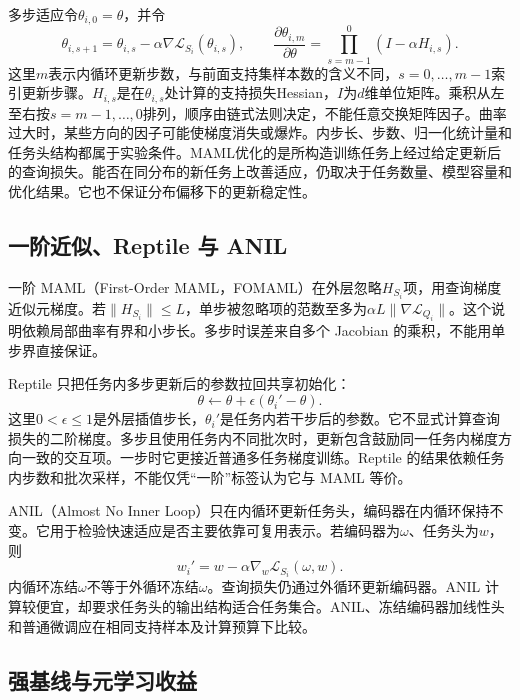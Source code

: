 多步适应令$\theta_{i,0}=\theta$，并令
\begin{equation}
\theta_{i,s+1}=\theta_{i,s}-\alpha\nabla\mathcal L_{S_i}(\theta_{i,s}),\qquad
\frac{\partial\theta_{i,m}}{\partial\theta}
=\prod_{s=m-1}^{0}(I-\alpha H_{i,s}).
\end{equation}
这里$m$表示内循环更新步数，与前面支持集样本数的含义不同，$s=0,\ldots,m-1$索引更新步骤。$H_{i,s}$是在$\theta_{i,s}$处计算的支持损失Hessian，$I$为$d$维单位矩阵。乘积从左至右按$s=m-1,\ldots,0$排列，顺序由链式法则决定，不能任意交换矩阵因子。曲率过大时，某些方向的因子可能使梯度消失或爆炸。内步长、步数、归一化统计量和任务头结构都属于实验条件。MAML优化的是所构造训练任务上经过给定更新后的查询损失。能否在同分布的新任务上改善适应，仍取决于任务数量、模型容量和优化结果。它也不保证分布偏移下的更新稳定性。

\subsection{一阶近似、Reptile 与 ANIL}

一阶 MAML（First-Order MAML，FOMAML）在外层忽略$H_{S_i}$项，用查询梯度近似元梯度\cite{nichol2018reptile}。若$\|H_{S_i}\|\leq L$，单步被忽略项的范数至多为$\alpha L\|\nabla\mathcal L_{Q_i}\|$。这个说明依赖局部曲率有界和小步长。多步时误差来自多个 Jacobian 的乘积，不能用单步界直接保证。

Reptile 只把任务内多步更新后的参数拉回共享初始化\cite{nichol2018reptile}：
\begin{equation}
\theta\leftarrow\theta+\epsilon(\theta_i'-\theta).
\label{eq:meta-reptile-update}
\end{equation}
这里$0<\epsilon\leq1$是外层插值步长，$\theta_i'$是任务内若干步后的参数。它不显式计算查询损失的二阶梯度。多步且使用任务内不同批次时，更新包含鼓励同一任务内梯度方向一致的交互项。一步时它更接近普通多任务梯度训练。Reptile 的结果依赖任务内步数和批次采样，不能仅凭“一阶”标签认为它与 MAML 等价。

ANIL（Almost No Inner Loop）只在内循环更新任务头，编码器在内循环保持不变\cite{raghu2020anil}。它用于检验快速适应是否主要依靠可复用表示。若编码器为$\omega$、任务头为$w$，则
\begin{equation}
w_i'=w-\alpha\nabla_w\mathcal L_{S_i}(\omega,w).
\end{equation}
内循环冻结$\omega$不等于外循环冻结$\omega$。查询损失仍通过外循环更新编码器。ANIL 计算较便宜，却要求任务头的输出结构适合任务集合。ANIL、冻结编码器加线性头和普通微调应在相同支持样本及计算预算下比较。

\subsection{强基线与元学习收益}


